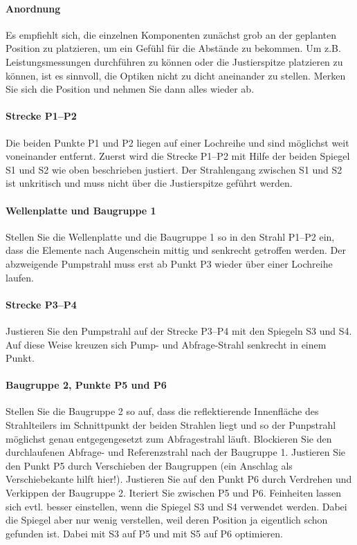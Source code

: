 \paragraph{Anordnung} Es empfiehlt sich, die einzelnen Komponenten zunächst grob an der geplanten Position zu platzieren, um ein Gefühl für die Abstände zu bekommen. Um z.B. Leistungsmessungen durchführen zu können oder die Justierspitze platzieren zu können, ist es sinnvoll, die Optiken nicht zu dicht aneinander zu stellen. Merken Sie sich die Position und nehmen Sie dann alles wieder ab.

\paragraph{Strecke P1--P2} Die beiden Punkte P1 und P2 liegen auf einer Lochreihe und sind möglichst weit voneinander entfernt. Zuerst wird die Strecke P1--P2 mit Hilfe der beiden Spiegel S1 und S2 wie oben beschrieben justiert. Der Strahlengang zwischen S1 und S2 ist unkritisch und muss nicht über die Justierspitze geführt werden. 

\paragraph{Wellenplatte und Baugruppe 1}  Stellen Sie die Wellenplatte und die Baugruppe 1 so in den Strahl P1--P2 ein, dass die Elemente nach Augenschein mittig und senkrecht getroffen werden.  Der abzweigende Pumpstrahl muss erst ab Punkt P3 wieder über einer Lochreihe laufen.

\paragraph{Strecke P3--P4} Justieren Sie den Pumpstrahl auf der Strecke P3--P4 mit den Spiegeln S3 und S4. Auf diese Weise kreuzen sich Pump- und Abfrage-Strahl senkrecht in einem Punkt.

\paragraph{Baugruppe 2, Punkte P5 und P6}  Stellen Sie  die Baugruppe 2 so auf, dass die reflektierende Innenfläche des Strahlteilers im Schnittpunkt der beiden Strahlen liegt und so der Punpstrahl möglichst genau entgegengesetzt zum  Abfragestrahl läuft. Blockieren Sie den durchlaufenen Abfrage- und Referenzstrahl nach der Baugruppe 1. Justieren Sie den Punkt P5 durch Verschieben der Baugruppen (ein Anschlag als Verschiebekante hilft hier!). Justieren Sie auf den Punkt P6 durch Verdrehen und Verkippen der Baugruppe 2. Iteriert Sie zwischen P5 und P6. Feinheiten lassen sich evtl. besser einstellen, wenn die Spiegel S3 und S4 verwendet werden. Dabei die Spiegel aber nur wenig verstellen, weil deren Position ja eigentlich schon gefunden ist. Dabei mit S3 auf P5 und mit S5 auf P6 optimieren.


